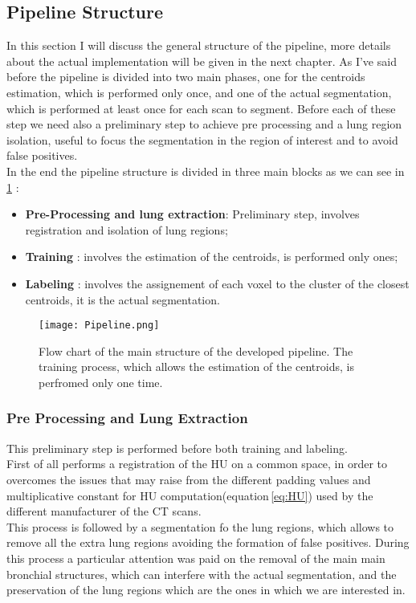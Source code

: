 \documentclass{standalone}
\begin{document}
	\subsection{Pipeline Structure}
	
	In this section I will discuss the general structure of the pipeline, more details about the actual implementation will be given in the next chapter. As I've said before the pipeline is divided into two main phases, one for the centroids estimation, which is performed only once, and one of the actual segmentation, which is performed at least once for each scan to segment. Before each of these step we need also a preliminary step to achieve pre processing and a lung region isolation, useful to focus the segmentation in the region of interest and to avoid false positives.\\
	In the end the pipeline structure is divided in three main blocks as we can see in \figurename\,\ref{fig:Pipeline} : 
	\begin{itemize}
		\item \textbf{Pre-Processing and lung extraction}: Preliminary step, involves registration and isolation of lung regions;
		\item \textbf{Training} : involves the estimation of the centroids, is performed only ones; 
		\item \textbf{Labeling} : involves the assignement of each voxel to the cluster of the closest centroids, it is the actual segmentation.
	\end{itemize}
	
		
	\begin{figure}[h!]\label{fig:Pipeline}
		\centering 
		\texttt{[image: Pipeline.png]}
		\caption{Flow chart of the main structure of the developed pipeline. The training process, which allows the estimation of the centroids, is perfromed only one time.}
	\end{figure} 
	
	
	\subsubsection*{Pre Processing and Lung Extraction}
	
	This preliminary step is performed before both training and labeling.\\
	First of all performs a registration of the HU on a common space, in order to overcomes the issues that may raise from the different padding values and multiplicative constant for HU computation(equation\,\ref{eq:HU}) used by the different manufacturer of the CT scans.\\
	This process is followed by a segmentation fo the lung regions, which allows to remove all the extra lung regions avoiding the formation of false positives. During this process a particular attention was paid on the removal of the main main bronchial structures, which can interfere with the actual segmentation, and the preservation of the lung regions which are the ones in which we are interested in.
	
\end{document}
